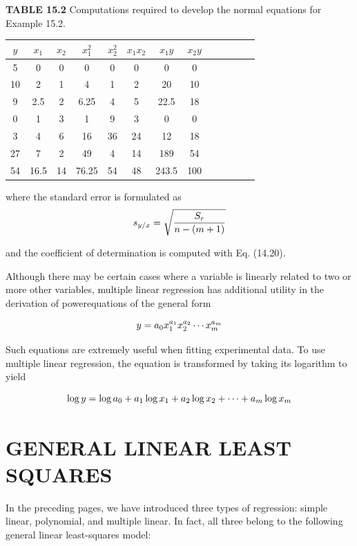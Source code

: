 \documentclass[../main.tex]{subfiles}
\begin{document}
\textbf{TABLE 15.2} \quad Computations required to develop the normal equations for Example 15.2.

\begin{tabular}{c c c c c c c c c c c c c}
	$y$ & $x_1$ & $x_2$ & $x^2_1$ & $x_2^2$ & $x_1 x_2$ & $x_1 y$ & $x_2 y$ \\ 
	\hline
	5 & 0 & 0 & 0 & 0 & 0 & 0 & 0 \\ 
	10 & 2 & 1 & 4 & 1 & 2 & 20 & 10 \\ 
	9 & 2.5 & 2 & 6.25 & 4 & 5 & 22.5 & 18 \\ 
	0 & 1 & 3 & 1 & 9 & 3 & 0 & 0 \\ 
	3 & 4 & 6 & 16 & 36 & 24 & 12 & 18 \\ 
	27 & 7 & 2 & 49 & 4 & 14 & 189 & 54 \\ 
	54 & 16.5 & 14 & 76.25 & 54 & 48 & 243.5 & 100            
\end{tabular}

\noindent where the standard error is formulated as
\begin{equation}
	\notag
	s_{y/x} = \sqrt{\frac{S_r}{n - (m + 1)}}
\end{equation}

\noindent and the coefficient of determination is computed with Eq. (14.20).

Although there may be certain cases where a variable is linearly related to two or more other variables, multiple linear regression has additional utility in the derivation of powerequations of the general form 

\begin{equation}
	\notag
	y = a_0 x_1 ^ {a_1} x_2 ^ {a_2} \cdots x_m ^ {a_m}
\end{equation}

\noindent Such equations are extremely useful when fitting experimental data. To use multiple linear regression, the equation is transformed by taking its logarithm to yield

\begin{equation}
	\notag
	\log y = \log a_0 + a_1 \log x_1 + a_2 \log x_2 + \cdots + a_m \log x_m
\end{equation}

\label{cha:cha_P_15_3} %
\section{GENERAL LINEAR LEAST SQUARES}

\noindent In the preceding pages, we have introduced three types of regression: simple linear, polynomial, and multiple linear. In fact, all three belong to the following general linear least-squares model:
\end{document}
